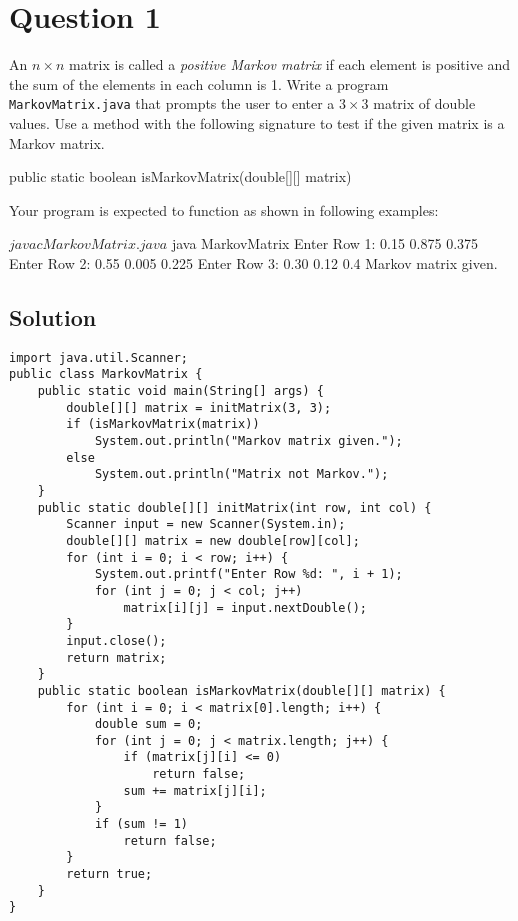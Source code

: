 \section*{Question 1}

An $n \times n$ matrix is called a \textit{positive Markov matrix} if each element is positive and the sum of the elements in each column is 1.
Write a program \texttt{MarkovMatrix.java} that prompts the user to enter a $3 \times 3$ matrix of double values.
Use a method with the following signature to test if the given matrix is a Markov matrix.

\begin{terminal}
public static boolean isMarkovMatrix(double[][] matrix)
\end{terminal}

Your program is expected to function as shown in following examples:

\begin{terminal}
$ javac MarkovMatrix.java
$ java MarkovMatrix
Enter Row 1: 0.15 0.875 0.375
Enter Row 2: 0.55 0.005 0.225
Enter Row 3: 0.30 0.12 0.4
Markov matrix given.
\end{terminal}

\newpage

\subsection*{Solution}

\lstset{language=Java,tabsize=4}
\begin{lstlisting}
import java.util.Scanner;
public class MarkovMatrix {
	public static void main(String[] args) {
		double[][] matrix = initMatrix(3, 3);
		if (isMarkovMatrix(matrix))
			System.out.println("Markov matrix given.");
		else
			System.out.println("Matrix not Markov.");
	}
	public static double[][] initMatrix(int row, int col) {
		Scanner input = new Scanner(System.in);
		double[][] matrix = new double[row][col];
		for (int i = 0; i < row; i++) {
			System.out.printf("Enter Row %d: ", i + 1);
			for (int j = 0; j < col; j++)
				matrix[i][j] = input.nextDouble();
		}
		input.close();
		return matrix;
	}
	public static boolean isMarkovMatrix(double[][] matrix) {
		for (int i = 0; i < matrix[0].length; i++) {
			double sum = 0;
			for (int j = 0; j < matrix.length; j++) {
				if (matrix[j][i] <= 0)
					return false;
				sum += matrix[j][i];
			}
			if (sum != 1)
				return false;
		}
		return true;
	}
}
\end{lstlisting}

